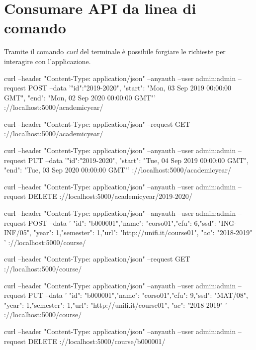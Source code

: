 \documentclass{article}
\begin{document}
\newpage
\section{Consumare API da linea di comando}
Tramite il comando \emph{curl} del terminale è possibile forgiare le richieste per interagire con l'applicazione.

\begin{shell}[caption=CRUD academicyear]
curl --header "Content-Type: application/json" --anyauth --user admin:admin --request POST --data '{"id":"2019-2020", "start": "Mon, 03 Sep 2019 00:00:00 GMT", "end": "Mon, 02 Sep 2020 00:00:00 GMT"}' \http://localhost:5000/academicyear/

curl --header "Content-Type: application/json" --request GET \http://localhost:5000/academicyear/

curl --header "Content-Type: application/json" --anyauth --user admin:admin --request PUT --data '{"id":"2019-2020", "start": "Tue, 04 Sep 2019 00:00:00 GMT", "end": "Tue, 03 Sep 2020 00:00:00 GMT"}' \http://localhost:5000/academicyear/

curl --header "Content-Type: application/json" --anyauth --user admin:admin --request DELETE \http://localhost:5000/academicyear/2019-2020/
\end{shell}


\begin{shell}[caption=CRUD course]
curl --header "Content-Type: application/json" --anyauth --user admin:admin --request POST --data '{ "id": "b000001","name": "corso01","cfu": 6,"ssd": "ING-INF/05", "year": 1,"semester": 1,"url": "http://unifi.it/course01", "ac": "2018-2019" }'  \http://localhost:5000/course/

curl --header "Content-Type: application/json" --request GET \http://localhost:5000/course/

curl --header "Content-Type: application/json" --anyauth --user admin:admin --request PUT --data '{ "id": "b000001","name": "corso01","cfu": 9,"ssd": "MAT/08", "year": 1,"semester": 1,"url": "http://unifi.it/course01", "ac": "2018-2019" }'  \http://localhost:5000/course/

curl --header "Content-Type: application/json" --anyauth --user admin:admin --request DELETE \http://localhost:5000/course/b000001/
\end{shell}
\end{document}

